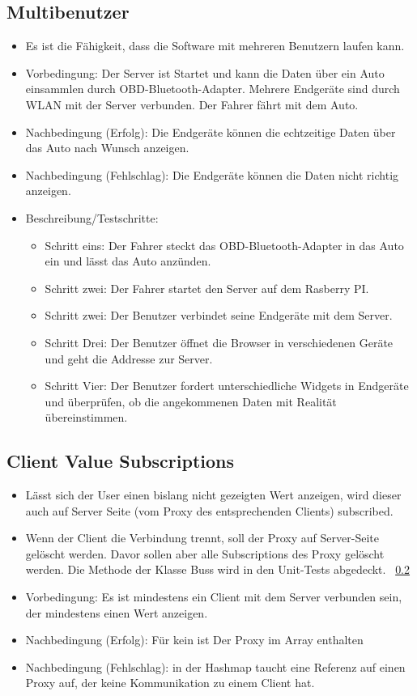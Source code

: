 \documentclass[qualitaetssicherung.tex]{subfiles}
\begin{document}
	\subsection{Multibenutzer}
		\begin{itemize}
			\item
			Es ist die Fähigkeit, dass die Software mit mehreren Benutzern laufen kann.
			\item
			Vorbedingung: Der Server ist Startet und kann die Daten über ein Auto
			einsammlen durch OBD-Bluetooth-Adapter. Mehrere Endgeräte sind durch WLAN
			mit der Server verbunden. Der Fahrer fährt mit dem Auto.
			\item
			Nachbedingung (Erfolg): Die Endgeräte können die echtzeitige Daten über das
			Auto nach Wunsch anzeigen.
			\item
			Nachbedingung (Fehlschlag): Die Endgeräte können die Daten nicht richtig
			anzeigen.
			\item
			Beschreibung/Testschritte:
			\begin{itemize}
				\item
				Schritt eins: Der Fahrer steckt das OBD-Bluetooth-Adapter in das Auto
				ein und lässt das Auto anzünden.
				\item
				Schritt zwei: Der Fahrer startet den Server auf dem Rasberry PI.
				\item
				Schritt zwei: Der Benutzer verbindet seine Endgeräte mit dem Server.
				\item 
				Schritt Drei: Der Benutzer öffnet die Browser in verschiedenen Geräte
				und geht die Addresse zur Server.
				\item 
				Schritt Vier: Der Benutzer fordert unterschiedliche Widgets in
				Endgeräte und überprüfen, ob die angekommenen Daten mit Realität
				übereinstimmen.
			\end{itemize}
		\end{itemize}
			\subsection{Client Value Subscriptions}
		\begin{itemize}
			\item Lässt sich der User einen bislang nicht gezeigten Wert anzeigen, wird dieser auch auf Server Seite (vom Proxy des entsprechenden Clients) subscribed.
			\item Wenn der Client die Verbindung trennt, soll der Proxy auf Server-Seite gelöscht werden. Davor sollen aber alle Subscriptions des Proxy gelöscht werden. Die Methode  der Klasse Buss wird in den Unit-Tests abgedeckt.  ~\ref{}
			\item Vorbedingung: Es ist mindestens ein Client mit dem Server verbunden sein, der mindestens einen Wert anzeigen.
			\item
			Nachbedingung (Erfolg): Für kein  ist Der Proxy im Array  enthalten
			\item
			Nachbedingung (Fehlschlag): in der Hashmap  taucht eine Referenz auf einen Proxy auf, der keine Kommunikation zu einem Client hat.
		\end{itemize}
\end{document}
